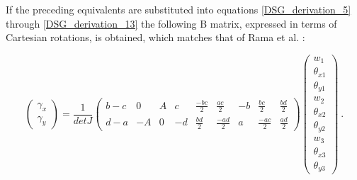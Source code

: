 If the preceding equivalents are substituted into equations \ref{DSG_derivation_5} through \ref{DSG_derivation_13} the following B matrix, expressed in terms of Cartesian rotations, is obtained, which matches that of Rama et al. \cite{Ram16}:

\begin{equation} 
\begin{pmatrix}
\gamma_x \\
\gamma_y 
\end{pmatrix}
=
\frac{1}{detJ}
\begin{pmatrix}
b-c & 0 & A & c & \frac{-bc}{2} & \frac{ac}{2} & -b & \frac{bc}{2} & \frac{bd}{2} \\
d-a & -A & 0 & -d & \frac{bd}{2} & \frac{-ad}{2} & a & \frac{-ac}{2} & \frac{ad}{2}
\end{pmatrix}
\begin{pmatrix}
w_1 \\
\theta_{x1} \\
\theta_{y1} \\
w_2 \\
\theta_{x2} \\
\theta_{y2} \\
w_3 \\
\theta_{x3} \\
\theta_{y3} 
\end{pmatrix}
\label{DSG_derivation_17}\ .
\end{equation}
